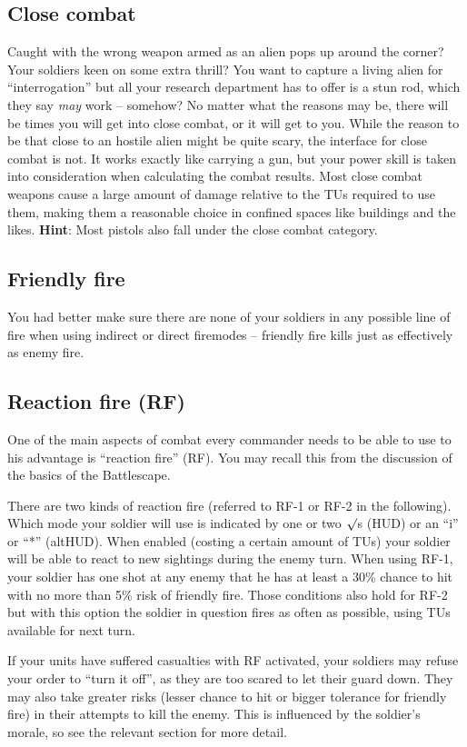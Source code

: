 \subsection{Close combat}
Caught with the wrong weapon armed as an alien pops up around the corner?
Your soldiers keen on some extra thrill? You want to capture a living alien for ``interrogation'' but all your research department has to offer is a stun rod, which they say \emph{may} work -- somehow? No matter what the reasons may be, there will be times you will get into close combat, or it will get to you. While the reason to be that close to an hostile alien might be quite scary, the interface for close combat is not. It works exactly like carrying a gun, but your power skill is taken into consideration when calculating the combat results. Most close combat weapons cause a large amount of damage relative to the TUs required to use them, making them a reasonable choice in confined spaces like buildings and the likes. \textbf{Hint}: Most pistols also fall under the close combat category.

\subsection{Friendly fire}
You had better make sure there are none of your soldiers in any possible line of fire when using indirect or direct firemodes -- friendly fire kills just as effectively as enemy fire.

\subsection{Reaction fire (RF)}
One of the main aspects of combat every commander needs to be able to use to his advantage is ``reaction fire'' (RF). You may recall this from the discussion of the basics of the Battlescape. 

There are two kinds of reaction fire (referred to RF-1 or RF-2 in the following). Which mode your soldier will use is indicated by one or two $\surd$s (HUD) or an ``i'' or ``*'' (altHUD). When enabled (costing a certain amount of TUs) your soldier will be able to react to new sightings during the enemy turn. When using RF-1, your soldier has one shot at any enemy that he has at least a 30\% chance to hit with no more than 5\% risk of friendly fire. Those conditions also hold for RF-2 but with this option the soldier in question fires as often as possible, using TUs available for next turn.

If your units have suffered casualties with RF activated, your soldiers may refuse your order to ``turn it off'', as they are too scared to let their guard down.  They may also take greater risks (lesser chance to hit or bigger tolerance for friendly fire) in their attempts to kill the enemy.  This is influenced by the soldier's morale, so see the relevant section for more detail.

